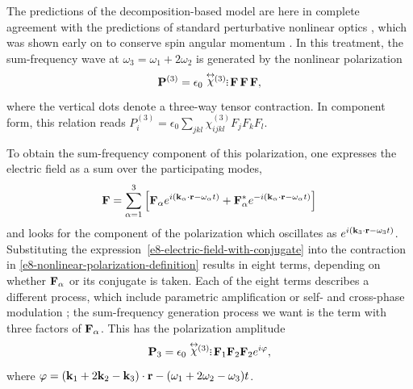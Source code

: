 The predictions of the decomposition-based model are here in complete agreement with the predictions of standard perturbative nonlinear optics \cite{VectorFourWaveMixing, AgrawalFiberOptics}, which was shown early on to conserve spin angular momentum \cite{BloembergenConservationLaws, SelectionRulesNonlinearOptics}. In this treatment, the sum-frequency wave at $\omega_3=\omega_1+2\omega_2$ is generated by the nonlinear polarization 
\begin{equation}
\vbP^{(3)}=\epsilon_0\chit
\tdots
\vbf\,\vbf\,\vbf,
\label{e8-nonlinear-polarization-definition}
\end{equation}
where the vertical dots denote a three-way tensor contraction. In component form, this relation reads $P^{(3)}_i=\epsilon_0 \sum_{jkl} \chi^{(3)}_{ijkl} F_jF_kF_l$.



To obtain the sum-frequency component of this polarization, one expresses the electric field as a sum over the participating modes, 
\begin{equation}
  \vb{F}=\sum_{\alpha=1}^3\left[
  \vb{F}_\alpha e^{i(\vb{k}_\alpha\cdot \vb{r}-\omega_\alpha t)}
  +
  \vb{F}_\alpha^\ast e^{-i(\vb{k}_\alpha\cdot \vb{r}-\omega_\alpha t)}
  \right]
  \label{e8-electric-field-with-conjugate}
\end{equation}
and looks for the component of the polarization which oscillates as $e^{i(\vb{k}_3\cdot\vb{r}-\omega_3 t)}$. Substituting the expression~\eqref{e8-electric-field-with-conjugate} into the contraction in \eqref{e8-nonlinear-polarization-definition} results in eight terms, depending on whether $\vb{F}_\alpha$ or its conjugate is taken. Each of the eight terms describes a different process, which include parametric amplification or self- and cross-phase modulation \cite{AgrawalFiberOptics}; the sum-frequency generation process we want is the term with three factors of  $\vb{F}_\alpha$. This has the polarization amplitude
\begin{equation}
\vbP_3=\epsilon_0\chit
\tdots
\vbf_1\vbf_2\vbf_2 e^{i\varphi},
\label{e8-nonlinear-polarization-amplitudes}
\end{equation}
where $\varphi=(\vb{k}_1+2\vb{k}_2-\vb{k}_3)\cdot\vb{r}-(\omega_1+2\omega_2-\omega_3)t$.




